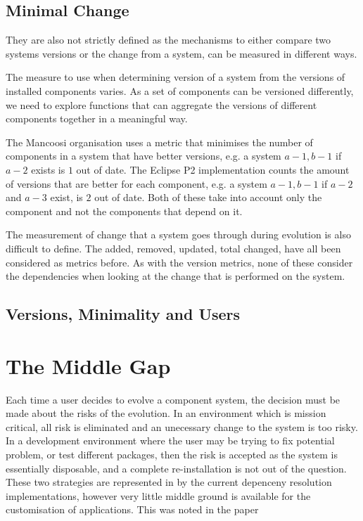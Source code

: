 \subsection{Minimal Change}
They are also not strictly defined as the mechanisms to either compare two systems versions or the change from a system,
can be measured in different ways.

The measure to use when determining version of a system from the versions of installed components varies.
As a set of components can be versioned differently, 
we need to explore functions that can aggregate the versions of different components together in a meaningful way.

The Mancoosi organisation uses a metric that minimises the number of components in a system that have better versions, 
e.g. a system $a-1,b-1$ if $a-2$ exists is $1$ out of date. 
The Eclipse P2 implementation counts the amount of versions that are better for each component,
e.g. a system $a-1,b-1$ if $a-2$ and $a-3$ exist, is $2$ out of date.
Both of these take into account only the component and not the components that depend on it.

The measurement of change that a system goes through during evolution is also difficult to define.
The added, removed, updated, total changed, have all been considered as metrics before. 
As with the version metrics, none of these consider the dependencies when looking at the change that is performed on the system.

\subsection{Versions, Minimality and Users}

\section{The Middle Gap}
Each time a user decides to evolve a component system, the decision must be made about the risks of the evolution.
In an environment which is mission critical, all risk is eliminated and an unecessary change to the system is too risky.
In a development environment where the user may be trying to fix potential problem, 
or test different packages, then the risk is accepted as the system is essentially disposable, and a complete re-installation is not out of the question.
These two strategies are represented in by the current depenceny resolution implementations, however very little middle ground is available for the customisation of applications.
This was noted in the paper %

